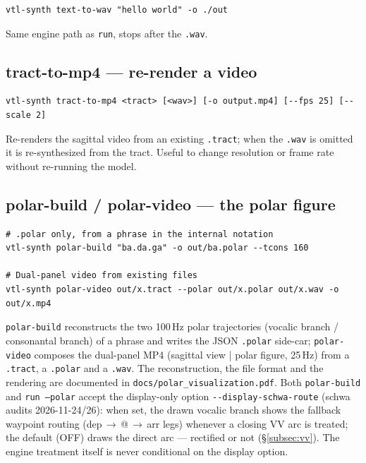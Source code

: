 \documentclass[11pt,a4paper]{article}
\begin{document}
\begin{lstlisting}[style=shell]
vtl-synth text-to-wav "hello world" -o ./out
\end{lstlisting}

Same engine path as \texttt{run}, stops after the \texttt{.wav}.

\subsection{tract-to-mp4 --- re-render a video}

\begin{lstlisting}[style=shell]
vtl-synth tract-to-mp4 <tract> [<wav>] [-o output.mp4] [--fps 25] [--scale 2]
\end{lstlisting}

Re-renders the sagittal video from an existing \texttt{.tract}; when the
\texttt{.wav} is omitted it is re-synthesized from the tract. Useful to
change resolution or frame rate without re-running the model.

\subsection{polar-build / polar-video --- the polar figure}

\begin{lstlisting}[style=shell]
# .polar only, from a phrase in the internal notation
vtl-synth polar-build "ba.da.ga" -o out/ba.polar --tcons 160

# Dual-panel video from existing files
vtl-synth polar-video out/x.tract --polar out/x.polar out/x.wav -o out/x.mp4
\end{lstlisting}

\texttt{polar-build} reconstructs the two 100\,Hz polar trajectories
(vocalic branch / consonantal branch) of a phrase and writes the JSON
\texttt{.polar} side-car; \texttt{polar-video} composes the
dual-panel MP4 (sagittal view | polar figure, 25\,Hz) from a
\texttt{.tract}, a \texttt{.polar} and a \texttt{.wav}. The
reconstruction, the file format and the rendering are documented in
\texttt{docs/polar\_visualization.pdf}. Both \texttt{polar-build} and
\texttt{run --polar} accept the display-only option
\texttt{-{}-display-schwa-route} (schwa audits 2026-11-24/26): when
set, the drawn vocalic branch shows the fallback waypoint routing
(dep\,$\to$\,@\,$\to$\,arr legs) whenever a closing VV arc is
treated; the default (OFF) draws the direct arc --- rectified or not
(\S\ref{subsec:vv}). The engine treatment itself is never conditional
on the display option.
\end{document}
